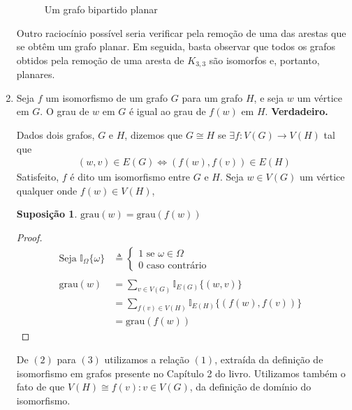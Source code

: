 \documentclass{homework}
\newtheorem*{supposition}{Suposição}
\begin{document}
\begin{enumerate}[label=\textbf{\arabic*)}]
	\begin{figure}[H]
		\centering
		
		\caption{Um grafo bipartido planar}
		\label{fig:1.3.1}
	\end{figure}
	
	Outro raciocínio possível seria verificar pela remoção de uma das arestas que se obtêm um grafo planar. Em seguida, basta observar que todos os grafos obtidos pela remoção de uma aresta de $K_{3, 3}$ são isomorfos e, portanto, planares. \par
	
	\item Seja $f$ um isomorfismo de um grafo $G$ para um grafo $H$, e seja $w$ um vértice em $G$. O grau de $w$ em $G$ é igual ao grau de $f(w)$ em $H$. \textbf{Verdadeiro.} \par
	
	Dados dois grafos, $G$ e $H$, dizemos que $G \cong H$ se $\exists f : V(G) \to V(H)$ tal que
		\begin{align}
			(w, v) \in E(G) \iff (f(w), f(v)) \in E(H)
		\end{align}
	Satisfeito, $f$ é dito um isomorfismo entre $G$ e $H$. Seja $w \in V(G)$ um vértice qualquer onde $f(w) \in V(H)$,
	\begin{supposition}
		$\text{grau}(w) = \text{grau}(f(w))$
	\end{supposition}
	\begin{proof}
		\begin{align}
		\text{Seja } \mathbb{I}_{\Omega}\{\omega\} &\triangleq \begin{cases}
		1 \text{ se } \omega \in \Omega\\
		0 \text{ caso contrário}
		\end{cases} \nonumber \\
		~ \nonumber \\
		\text{grau}(w) &= \sum_{v \in V(G)} \mathbb{I}_{E(G)}\{(w, v)\}\\
					   &= \sum_{f(v) \in V(H)} \mathbb{I}_{E(H)}\{(f(w), f(v))\}\\
					   &= \text{grau}(f(w)) & \nonumber
		\end{align}
	\end{proof}

	De $(2)$ para $(3)$ utilizamos a relação $(1)$, extraída da definição de isomorfismo em grafos presente no Capítulo 2 do livro\cite{jayme:18}. Utilizamos também o fato de que $V(H) \cong {f(v) : v \in V(G)}$, da definição de domínio do isomorfismo. \par
	

\end{enumerate}
\end{document}
